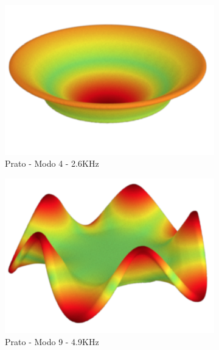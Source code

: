 \begin{figure}[ht]
\begin{subfigure}{0.32\textwidth}
	\centering
	\includegraphics[height=0.15\textheight]{mathematicalbackground/modes/plate_4.png}
	\caption{Prato - Modo 4 - 2.6KHz}\label{fig:plates_4}
\end{subfigure}%
\begin{subfigure}{0.32\textwidth}
	\centering
	\includegraphics[height=0.15\textheight]{mathematicalbackground/modes/plate_9.png}
	\caption{Prato - Modo 9 - 4.9KHz}\label{fig:plates_9}
\end{subfigure}%
\begin{subfigure}{0.32\textwidth}
	\centering

\end{subfigure}
\end{figure}
